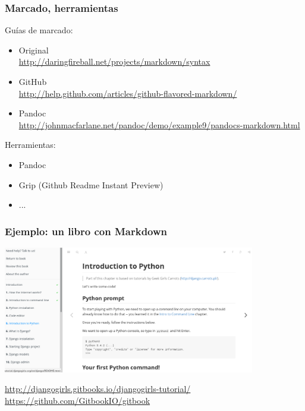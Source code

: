 \begin{frame}
\frametitle{Marcado, herramientas}

Guías de marcado:
\begin{itemize}
\item Original \\
{\small \url{http://daringfireball.net/projects/markdown/syntax}} \\
\item GitHub \\
{\small \url{http://help.github.com/articles/github-flavored-markdown/}} \\
\item Pandoc \\
{\small \url{http://johnmacfarlane.net/pandoc/demo/example9/pandocs-markdown.html}} \\
\end{itemize}

Herramientas:
\begin{itemize}
\item Pandoc
\item Grip (Github Readme Instant Preview)
\item ...
\end{itemize}

\end{frame}

\begin{frame}
\frametitle{Ejemplo: un libro con Markdown}

\begin{center}
\includegraphics[width=11cm]{figs/markdown-book}
\end{center}

\begin{flushright}
\url{http://djangogirls.gitbooks.io/djangogirls-tutorial/} \\
\url{https://github.com/GitbookIO/gitbook} \\
\end{flushright}

\end{frame}

